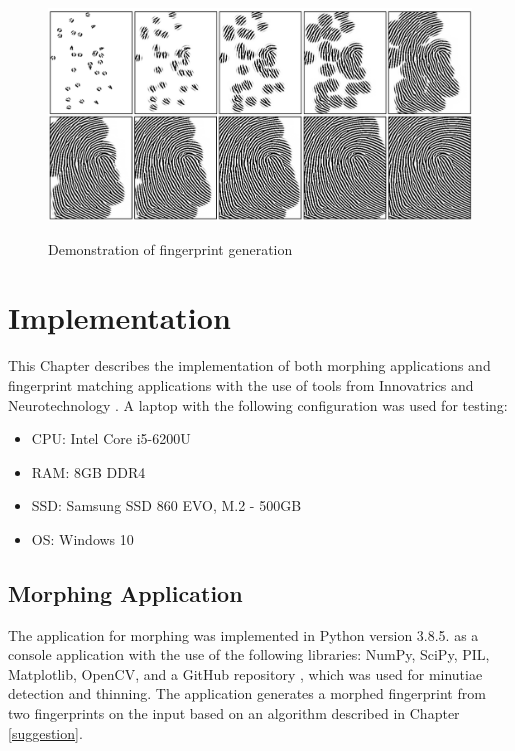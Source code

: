 \begin{figure}[H]
    \centering
        {\includegraphics[width=1\linewidth]{obrazky-figures/gen2.png}}\\
        \caption{Demonstration of fingerprint generation \cite{syntetic_gen_paper}}
        \label{fig:syn}
\end{figure}

\chapter{Implementation}
This Chapter describes the implementation of both morphing applications and fingerprint matching applications with the use of tools from Innovatrics \cite{innovatricsonline} and Neurotechnology \cite{Neurotechonline}. A laptop with the following configuration was used for testing:
\begin{itemize}
    \item CPU: Intel Core i5-6200U
    \item RAM: 8GB DDR4
    \item SSD: Samsung SSD 860 EVO, M.2 - 500GB
    \item OS: Windows 10
\end{itemize}

\section{Morphing Application}
\label{mainmorph}
The application for morphing was implemented in Python version 3.8.5. as a console application with the use of the following libraries: NumPy, SciPy, PIL, Matplotlib, OpenCV, and a GitHub repository \cite{GitHubme63:online}, which was used for minutiae detection and thinning. The application generates a morphed fingerprint from two fingerprints on the input based on an algorithm described in Chapter \ref{suggestion}. 

